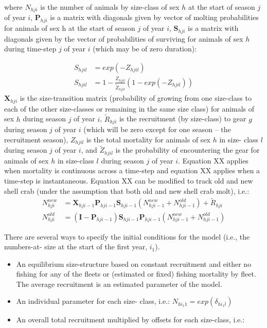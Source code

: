 \documentclass[]{article}
\begin{document}
where \(N_{hji}\) is the number of animals by size-class of sex \(h\) at
the start of season \(j\) of year \(i\), \(\textbf{P}_{hji}\) is a
matrix with diagonals given by vector of molting probabilities for
animals of sex h at the start of season \(j\) of year \(i\),
\(\textbf{S}_{hji}\) is a matrix with diagonals given by the vector of
probabilities of surviving for animals of sex \(h\) during time-step
\(j\) of year \(i\) (which may be of zero duration):

\begin{align}
S_{hjil} &= exp\left(-Z_{hjil} \right) \\ 
S_{hjil} &= 1-\frac{Z_{hjil}}{\widetilde{Z}_{hjil}  } \left(1- exp\left(-Z_{hjil} \right) \right) 
\end{align} \(\textbf{X}_{hji}\) is the size-transition matrix
(probability of growing from one size-class to each of the other
size-classes or remaining in the same size class) for animals of sex
\(h\) during season \(j\) of year \(i\), \(\widetilde{R}_{hji}\) is the
recruitment (by size-class) to gear \(g\) during season \(j\) of year
\(i\) (which will be zero except for one season -- the recruitment
season), \(Z_{hjil}\) is the total mortality for animals of sex \(h\) in
size- class \(l\) during season \(j\) of year \(i\), and
\(\tilde{Z}_{hjil}\) is the probability of encountering the gear for
animals of sex \(h\) in size-class \(l\) during season \(j\) of year
\(i\). Equation XX applies when mortality is continuous across a
time-step and equation XX applies when a time-step is instantaneous.
Equation XX can be modified to track old and new shell crab (under the
assumption that both old and new shell crab molt), i.e.: \begin{align}
N^{new}_{hji} &= \textbf{X}_{hji-1}\textbf{P}_{hji-1}  \textbf{S}_{hji-1} \left(  N^{new}_{hji-1} + N^{old}_{hji-1} \right) +  \widetilde{R}_{hji}   \\
N^{old}_{hji} &= \left( \textbf{I}-\textbf{P}_{hji-1}\right)  \textbf{S}_{hji-1}\textbf{P}_{hji-1}  \left(  N^{new}_{hji-1} + N^{old}_{hji-1} \right) 
\end{align}

There are several ways to specify the initial conditions for the model
(i.e., the numbers-at- size at the start of the first year, \(i_{1}\)).

\begin{itemize}
\item
  An equilibrium size-structure based on constant recruitment and either
  no fishing for any of the fleets or (estimated or fixed) fishing
  mortality by fleet. The average recruitment is an estimated parameter
  of the model.
\item
  An individual parameter for each size- class, i.e.:
  \(N_{hi_{1}1} = exp(\delta_{hi_{1}l})\)
\item
  An overall total recruitment multiplied by offsets for each
  size-class, i.e.:
\end{itemize}
\end{document}

